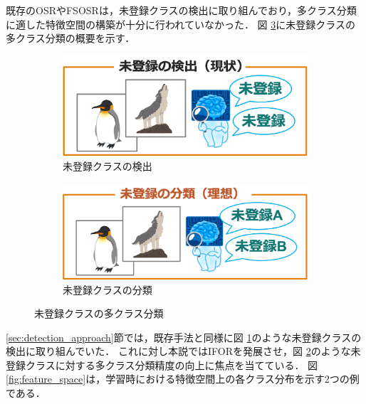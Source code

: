 既存のOSRやFSOSRは，未登録クラスの検出に取り組んでおり，多クラス分類に適した特徴空間の構築が十分に行われていなかった．
図 \ref{fig:classification_goals}に未登録クラスの多クラス分類の概要を示す．
% 
\begin{figure}[tbp]
  \centering
  \begin{subfigure}[b]{0.45\linewidth}
    \centering
    \includegraphics[width=\linewidth, keepaspectratio]{image/detection.png}
    \caption{未登録クラスの検出}
    \label{fig:detection}
  \end{subfigure}
  \hfill
  \begin{subfigure}[b]{0.45\linewidth}
    \centering
    \includegraphics[width=\linewidth, keepaspectratio]{image/classification.png}
    \caption{未登録クラスの分類}
    \label{fig:classification}
  \end{subfigure}
  \caption{未登録クラスの多クラス分類}
  \label{fig:classification_goals}
\end{figure}
%
\ref{sec:detection_approach}節では，既存手法と同様に図 \ref{fig:detection}のような未登録クラスの検出に取り組んでいた．
これに対し本説ではIFORを発展させ，図 \ref{fig:classification}のような未登録クラスに対する多クラス分類精度の向上に焦点を当てている．
図 \ref{fig:feature_space}は，学習時における特徴空間上の各クラス分布を示す2つの例である．
% 
